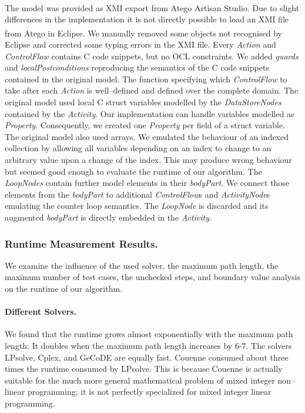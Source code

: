\documentclass[runningheads,a4paper]{llncs}%
\newcommand{\UMLType}[1]{\textsf{\textit{#1}}} %
\newcommand{\UMLReference}[1]{\textsf{\textit{#1}}} %
\begin{document}
The model was provided as XMI export from Atego\textsuperscript{\textregistered}
Artisan Studio. Due to slight differences in the implementation it is not
directly possible to load an XMI file from
Atego\textsuperscript{\textregistered} in Eclipse. We manually removed some
objects not recognised by Eclipse and corrected some typing errors in the XMI
file. Every \UMLType{Action} and \UMLReference{ControlFlow} contains C code
snippets, but no OCL constraints. We added \UMLReference{guards} and
\UMLReference{localPostconditions} reproducing the semantics of the C code
snippets contained in the original model. The function specifying which
\UMLType{ControlFlow} to take after each \UMLType{Action} is well--defined and
defined over the complete domain. The original model used local C struct
variables modelled by the \UMLType{DataStoreNodes} contained by the
\UMLType{Activity}. Our implementation can handle variables modelled as
\UMLType{Property}. Consequently, we created one \UMLType{Property} per field of
a struct variable. The original model also used arrays. We emulated the
behaviour of an indexed collection by allowing all variables depending on an
index to change to an arbitrary value upon a change of the index. This may
produce wrong behaviour but seemed good enough to evaluate the runtime of our
algorithm. The \UMLType{LoopNodes} contain further model elements in their
\UMLReference{bodyPart}. We connect those elements from the
\UMLReference{bodyPart} to additional \UMLType{ControlFlow}s and
\UMLType{ActivityNode}s emulating the counter loop semantics. The
\UMLType{LoopNode} is discarded and its augmented \UMLReference{bodyPart} is
directly embedded in the \UMLType{Activity}.
%
\subsubsection{Runtime Measurement Results.}
We examine the influence of the used solver, the maximum path length, the
maximum number of test cases, the unchecked steps, and boundary value analysis
on the runtime of our algorithm.
%
\paragraph{Different Solvers.}%
We found that the runtime grows almost exponentially with the maximum path
length: It doubles when the maximum path length increases by $6$-$7$. The
solvers LPsolve, Cplex, and GeCoDE are equally fast. Couenne consumed about
three times the runtime consumed by LPsolve. This is because Couenne is actually
suitable for the much more general mathematical problem of mixed integer
non--linear programming; it is not perfectly specialized for mixed integer
linear programming.
\end{document}
